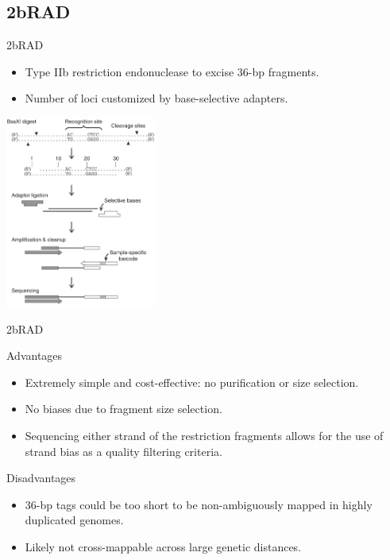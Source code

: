 \documentclass[presentation]{beamer}
\begin{document}
\subsection{2bRAD}
\label{sec-2-4}
\begin{frame}[label=sec-2-4-1]{2bRAD \citep{Wang2012}}
\begin{itemize}
\item Type IIb restriction endonuclease to excise 36-bp fragments.
\item Number of loci customized by base-selective adapters.
\end{itemize}

\begin{center}
\includegraphics[width=5cm]{Wang2012Fig1.png}


\tiny{\citep{Wang2012}}
\end{center}
\end{frame}

\begin{frame}[label=sec-2-4-2]{2bRAD \citep{Wang2012}}
\begin{block}{Advantages}
\begin{itemize}
\item Extremely simple and cost-effective: no purification or size selection.
\item No biases due to fragment size selection.
\item Sequencing either strand of the restriction fragments allows for the
use of strand bias as a quality filtering criteria.
\end{itemize}
\end{block}
\begin{block}{Disadvantages}
\begin{itemize}
\item 36-bp tags could be too short to be non-ambiguously mapped in highly
duplicated genomes.
\item Likely not cross-mappable across large genetic distances.
\end{itemize}
\end{block}
\end{frame}
\end{document}
